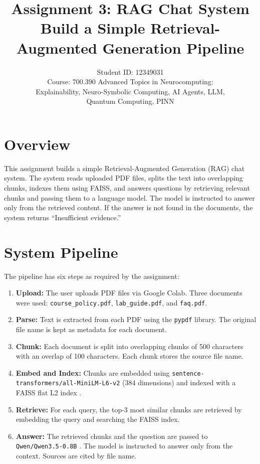 \documentclass[11pt,a4paper]{article}
\title{Assignment 3: RAG Chat System\\
\large Build a Simple Retrieval-Augmented Generation Pipeline}
\author{
    Student ID: 12349031 \\
    \small Course: 700.390 Advanced Topics in Neurocomputing:\\
    \small Explainability, Neuro-Symbolic Computing, AI Agents, LLM,\\
    \small Quantum Computing, PINN
}
\date{}
\begin{document}
\maketitle

\section{Overview}

This assignment builds a simple Retrieval-Augmented Generation (RAG) chat system. The system reads uploaded PDF files, splits the text into overlapping chunks, indexes them using FAISS, and answers questions by retrieving relevant chunks and passing them to a language model. The model is instructed to answer only from the retrieved content. If the answer is not found in the documents, the system returns ``Insufficient evidence.''

\section{System Pipeline}

The pipeline has six steps as required by the assignment:

\begin{enumerate}
    \item \textbf{Upload:} The user uploads PDF files via Google Colab. Three documents were used: \texttt{course\_policy.pdf}, \texttt{lab\_guide.pdf}, and \texttt{faq.pdf}.
    \item \textbf{Parse:} Text is extracted from each PDF using the \texttt{pypdf} library. The original file name is kept as metadata for each document.
    \item \textbf{Chunk:} Each document is split into overlapping chunks of 500 characters with an overlap of 100 characters. Each chunk stores the source file name.
    \item \textbf{Embed and Index:} Chunks are embedded using \texttt{sentence-transformers/all-MiniLM-L6-v2} \cite{reimers2019} (384 dimensions) and indexed with a FAISS flat L2 index \cite{johnson2021}.
    \item \textbf{Retrieve:} For each query, the top-3 most similar chunks are retrieved by embedding the query and searching the FAISS index.
    \item \textbf{Answer:} The retrieved chunks and the question are passed to \texttt{Qwen/Qwen3.5-0.8B} \cite{qwen2025}. The model is instructed to answer only from the context. Sources are cited by file name.
\end{enumerate}
\end{document}
